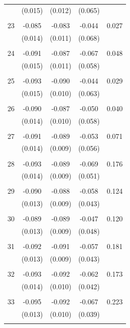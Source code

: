 \documentclass[12pt]{article}
\begin{document}
\begin{appendices}
\begin{singlespace}
{{\begin{longtable}{l*{1}{cccc}}
          & (0.015) & (0.012) & (0.065) & \\
 & & & &\\
  23       & -0.085 & -0.083 & -0.044 & 0.027 \\
          & (0.014) & (0.011) & (0.068) & \\
 & & & &\\
  24       & -0.091 & -0.087 & -0.067 & 0.048 \\
          & (0.015) & (0.011) & (0.058) & \\
 & & & &\\
  25       & -0.093 & -0.090 & -0.044 & 0.029 \\
          & (0.015) & (0.010) & (0.063) & \\
 & & & &\\
  26       & -0.090 & -0.087 & -0.050 & 0.040 \\
          & (0.014) & (0.010) & (0.058) & \\
 & & & &\\
  27       & -0.091 & -0.089 & -0.053 & 0.071 \\
          & (0.014) & (0.009) & (0.056) & \\
 & & & &\\
  28       & -0.093 & -0.089 & -0.069 & 0.176 \\
          & (0.014) & (0.009) & (0.051) & \\
 & & & &\\
  29       & -0.090 & -0.088 & -0.058 & 0.124 \\
          & (0.013) & (0.009) & (0.043) & \\
 & & & &\\
  30       & -0.089 & -0.089 & -0.047 & 0.120 \\
          & (0.013) & (0.009) & (0.048) & \\
 & & & &\\
  31       & -0.092 & -0.091 & -0.057 & 0.181 \\
          & (0.013) & (0.009) & (0.043) & \\
 & & & &\\
  32       & -0.093 & -0.092 & -0.062 & 0.173 \\
          & (0.014) & (0.010) & (0.042) & \\
 & & & &\\
  33       & -0.095 & -0.092 & -0.067 & 0.223 \\
          & (0.013) & (0.010) & (0.039) & \\
 & & & &\\

\end{longtable}}}
\end{singlespace}
\end{appendices}
\end{document}
